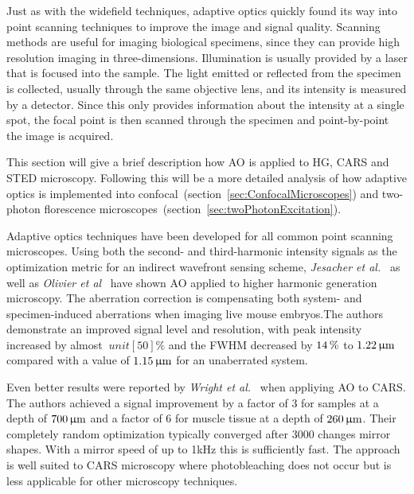 Just as with the widefield techniques, adaptive optics quickly found its way into point scanning techniques to improve the image and signal quality. Scanning methods are useful for imaging biological specimens, since they can provide high resolution imaging in three-dimensions. Illumination is usually provided by a laser that is focused into the sample. The light emitted or reflected from the specimen is collected, usually through the same objective lens, and its intensity is measured by a detector. Since this only provides information about the intensity at a single spot, the focal point is then scanned through the specimen and point-by-point the image is acquired. 

This section will give a brief description how AO is applied to HG, CARS and STED microscopy. Following this will be a more detailed analysis of how adaptive optics is implemented into confocal~(section~\ref{sec:ConfocalMicroscopes}) and two-photon florescence microscopes~(section~\ref{sec:twoPhotonExcitation}). 

Adaptive optics techniques have been developed for all common point scanning microscopes. Using both the second- and third-harmonic intensity signals as the optimization metric for an indirect wavefront sensing scheme, \emph{Jesacher et al.}~\cite{scan_HG_dynamic} as well as \emph{Olivier et al}~\cite{scan_HG_embryos} have shown AO applied to higher harmonic generation microscopy. The aberration correction is compensating both system- and specimen-induced aberrations when imaging live mouse embryos.The authors demonstrate an improved signal level and resolution, with peak intensity increased by almost $\ unit[50]{\%}$ and the FWHM decreased by $\unit[14]{\%}$ to  $\unit[1.22]{\upmu m}$ compared with a value of $\unit[1.15]{\upmu m}$ for an unaberrated system.

Even better results were reported by \emph{Wright et al.}~\cite{scan_CARS} when appliying AO to CARS. The authors achieved a signal improvement by a factor of 3 for samples at a depth of $\unit[700]{\upmu m}$ and a factor of 6 for muscle tissue at a depth of $\unit[260]{\upmu m}$. Their completely random optimization typically converged after 3000 changes mirror shapes. With a mirror speed of up to 1kHz this is sufficiently fast.  The approach is well suited to CARS microscopy where photobleaching does not occur but is less applicable for other microscopy techniques. 

